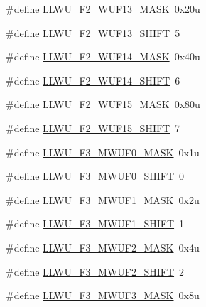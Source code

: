 \begin{DoxyCompactItemize}
\item 
\#define \hyperlink{group___l_l_w_u___register___masks_ga6618b24b83e2e28d9268c1f5fac431af}{L\+L\+W\+U\+\_\+\+F2\+\_\+\+W\+U\+F13\+\_\+\+M\+A\+SK}~0x20u
\item 
\#define \hyperlink{group___l_l_w_u___register___masks_ga6c8e71714d1a4c5e9b8dddb08d41679e}{L\+L\+W\+U\+\_\+\+F2\+\_\+\+W\+U\+F13\+\_\+\+S\+H\+I\+FT}~5
\item 
\#define \hyperlink{group___l_l_w_u___register___masks_ga5f6f604b22d249edf1101cd9aa087072}{L\+L\+W\+U\+\_\+\+F2\+\_\+\+W\+U\+F14\+\_\+\+M\+A\+SK}~0x40u
\item 
\#define \hyperlink{group___l_l_w_u___register___masks_ga775751b74c858d4adf406ff063630bbf}{L\+L\+W\+U\+\_\+\+F2\+\_\+\+W\+U\+F14\+\_\+\+S\+H\+I\+FT}~6
\item 
\#define \hyperlink{group___l_l_w_u___register___masks_gaa56b2f78b177bd14e66b3863dbb14625}{L\+L\+W\+U\+\_\+\+F2\+\_\+\+W\+U\+F15\+\_\+\+M\+A\+SK}~0x80u
\item 
\#define \hyperlink{group___l_l_w_u___register___masks_gaae1c32b7e20bbc817c4c5af4479e2a91}{L\+L\+W\+U\+\_\+\+F2\+\_\+\+W\+U\+F15\+\_\+\+S\+H\+I\+FT}~7
\item 
\#define \hyperlink{group___l_l_w_u___register___masks_ga1bb6bf136de15f4cc67eee67d53361a9}{L\+L\+W\+U\+\_\+\+F3\+\_\+\+M\+W\+U\+F0\+\_\+\+M\+A\+SK}~0x1u
\item 
\#define \hyperlink{group___l_l_w_u___register___masks_ga3b2c7982efa30073491d05e0dbc698e8}{L\+L\+W\+U\+\_\+\+F3\+\_\+\+M\+W\+U\+F0\+\_\+\+S\+H\+I\+FT}~0
\item 
\#define \hyperlink{group___l_l_w_u___register___masks_gafe847acbd5a46291dd05b8ab682efffe}{L\+L\+W\+U\+\_\+\+F3\+\_\+\+M\+W\+U\+F1\+\_\+\+M\+A\+SK}~0x2u
\item 
\#define \hyperlink{group___l_l_w_u___register___masks_ga6de4a2380bde727b70758cd1c818c859}{L\+L\+W\+U\+\_\+\+F3\+\_\+\+M\+W\+U\+F1\+\_\+\+S\+H\+I\+FT}~1
\item 
\#define \hyperlink{group___l_l_w_u___register___masks_ga3414123c30550a3dea14d84f931e2a0c}{L\+L\+W\+U\+\_\+\+F3\+\_\+\+M\+W\+U\+F2\+\_\+\+M\+A\+SK}~0x4u
\item 
\#define \hyperlink{group___l_l_w_u___register___masks_gac83dee08de7a4bdce21d454a9cfab059}{L\+L\+W\+U\+\_\+\+F3\+\_\+\+M\+W\+U\+F2\+\_\+\+S\+H\+I\+FT}~2
\item 
\#define \hyperlink{group___l_l_w_u___register___masks_gab85f671f2c6f2112c4e2e14845ef998b}{L\+L\+W\+U\+\_\+\+F3\+\_\+\+M\+W\+U\+F3\+\_\+\+M\+A\+SK}~0x8u
\item 

\end{DoxyCompactItemize}

